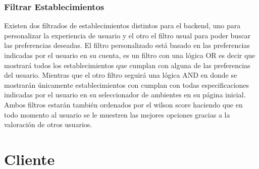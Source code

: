 \subsubsection{Filtrar Establecimientos}

Existen dos filtrados de establecimientos distintos para el backend, uno para personalizar la experiencia de usuario y el otro el filtro usual para poder buscar las preferencias deseadas. El filtro personalizado está basado en las preferencias indicadas por el usuario en su cuenta, es un filtro con una lógica OR es decir que mostrará todos los establecimientos que cumplan con alguna de las preferencias del usuario. Mientras que el otro filtro seguirá una lógica AND en donde se mostrarán únicamente establecimientos con cumplan con todas especificaciones indicadas por el usuario en su seleccionador de ambientes en su página inicial. Ambos filtros estarán también ordenados por el wilson score haciendo que en todo momento al usuario se le muestren las mejores opciones gracias a la valoración de otros usuarios.

\section{Cliente}